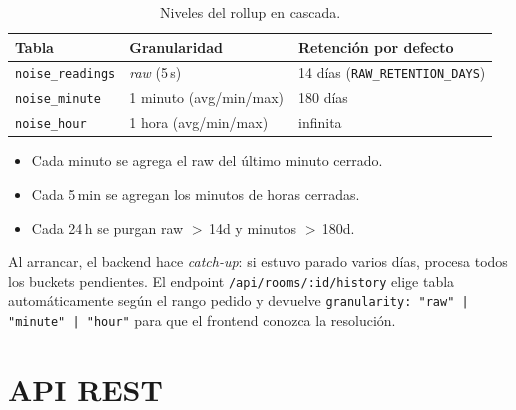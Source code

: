 \documentclass[11pt,a4paper,openany]{report}
\begin{document}
\begin{table}[H]
\centering
{}
\begin{tabularx}{\textwidth}{l l X}
\toprule
\rowcolor{TableHead}
\textbf{Tabla} & \textbf{Granularidad} & \textbf{Retenci\'on por defecto} \\ \midrule
\texttt{noise\_readings} & \emph{raw} (5\,s)        & 14 d\'ias (\texttt{RAW\_RETENTION\_DAYS}) \\
\texttt{noise\_minute}   & 1 minuto (avg/min/max)   & 180 d\'ias \\
\texttt{noise\_hour}     & 1 hora (avg/min/max)     & infinita \\ \bottomrule
\end{tabularx}
\caption{Niveles del rollup en cascada.}
\end{table}

\begin{itemize}
    \item Cada minuto se agrega el raw del \'ultimo minuto cerrado.
    \item Cada 5\,min se agregan los minutos de horas cerradas.
    \item Cada 24\,h se purgan raw $>$\,14d y minutos $>$\,180d.
\end{itemize}

Al arrancar, el backend hace \emph{catch-up}: si estuvo parado varios d\'ias, procesa todos los buckets pendientes. El endpoint \texttt{/api/rooms/:id/history} elige tabla autom\'aticamente seg\'un el rango pedido y devuelve \texttt{granularity: "raw" | "minute" | "hour"} para que el frontend conozca la resoluci\'on.

\section{API REST}
\end{document}

